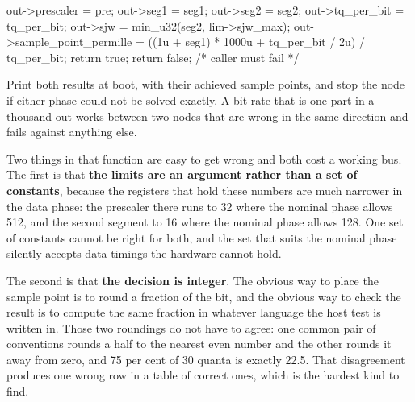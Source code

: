 \begin{steps}
\begin{ccode}
{{        out->prescaler = pre; out->seg1 = seg1; out->seg2 = seg2;
        out->tq_per_bit = tq_per_bit;
        out->sjw = min_u32(seg2, lim->sjw_max);
        out->sample_point_permille =
            ((1u + seg1) * 1000u + tq_per_bit / 2u) / tq_per_bit;
        return true;
    }
    return false;                                      /* caller must fail   */
}
\end{ccode}
Print both results at boot, with their achieved sample points, and stop the node
if either phase could not be solved exactly. A bit rate that is one part in a
thousand out works between two nodes that are wrong in the same direction and
fails against anything else.

Two things in that function are easy to get wrong and both cost a working bus.
The first is that \textbf{the limits are an argument rather than a set of
constants}, because the registers that hold these numbers are much narrower in
the data phase: the prescaler there runs to 32 where the nominal phase allows
512, and the second segment to 16 where the nominal phase allows 128. One set of
constants cannot be right for both, and the set that suits the nominal phase
silently accepts data timings the hardware cannot hold.

The second is that \textbf{the decision is integer}. The obvious way to place
the sample point is to round a fraction of the bit, and the obvious way to check
the result is to compute the same fraction in whatever language the host test is
written in. Those two roundings do not have to agree: one common pair of
conventions rounds a half to the nearest even number and the other rounds it
away from zero, and 75 per cent of 30 quanta is exactly 22.5. That disagreement
produces one wrong row in a table of correct ones, which is the hardest kind to
find.



\end{steps}
